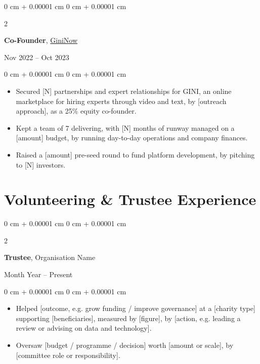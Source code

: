 \documentclass[10pt, letterpaper]{article}
\newenvironment{highlights}{
    \begin{itemize}[
        topsep=0.10 cm,
        parsep=0pt,
        partopsep=0pt,
        itemsep=0pt,
        leftmargin=0 cm + 10pt
    ]
}{
    \end{itemize}
}
\newenvironment{onecolentry}{
    \begin{adjustwidth}{
        0 cm + 0.00001 cm
    }{
        0 cm + 0.00001 cm
    }
}{
    \end{adjustwidth}
}
\newenvironment{twocolentry}[2][]{
    \onecolentry
    \def\secondColumn{#2}
    \setcolumnwidth{\fill, 4.5 cm}
    \begin{paracol}{2}
}{
    \switchcolumn \raggedleft \secondColumn
    \end{paracol}
    \endonecolentry
}
\begin{document}
\begin{twocolentry}{
    Nov 2022 -- Oct 2023
}
    \textbf{Co-Founder}, \href{https://gininow.com}{GiniNow}
\end{twocolentry}

\vspace{0.10 cm}

\begin{onecolentry}
    \begin{highlights}
        \item Secured [N] partnerships and expert relationships for GINI, an online marketplace for hiring experts through video and text, by [outreach approach], as a 25\% equity co-founder.
        \item Kept a team of 7 delivering, with [N] months of runway managed on a [amount] budget, by running day-to-day operations and company finances.
        \item Raised a [amount] pre-seed round to fund platform development, by pitching to [N] investors.
    \end{highlights}
\end{onecolentry}

\vspace{0.2 cm}



\section{Volunteering \& Trustee Experience}

\begin{twocolentry}{
    Month Year -- Present
}
    \textbf{Trustee}, Organisation Name
\end{twocolentry}

\vspace{0.10 cm}

\begin{onecolentry}
    \begin{highlights}
        \item Helped [outcome, e.g. grow funding / improve governance] at a [charity type] supporting [beneficiaries], measured by [figure], by [action, e.g. leading a review or advising on data and technology].
        \item Oversaw [budget / programme / decision] worth [amount or scale], by [committee role or responsibility].
    \end{highlights}
\end{onecolentry}
\end{document}
